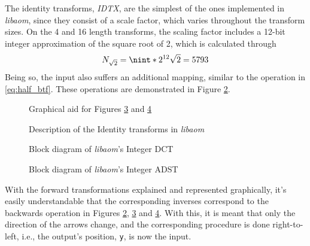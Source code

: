The identity transforms, \emph{IDTX}, are the simplest of the ones implemented in \emph{libaom}, since they consist of a scale factor, which varies throughout the transform sizes. On the 4 and 16 length transforms, the scaling factor includes a 12-bit integer approximation of the square root of 2, which is calculated through
\begin{equation}
    N_{\sqrt{2}}=\nint*{2^{12}\sqrt{2}}=5793
\end{equation}
Being so, the input also suffers an additional mapping, similar to the operation in \ref{eq:half_btf}. These operations are demonstrated in Figure \ref{fig:intIDEN}.

\begin{figure}[!htbp]
    \centering
    
    \caption{Graphical aid for Figures \ref{fig:intDCT} and \ref{fig:intADST}}
    \label{fig:aid}
\end{figure}

\begin{figure}[!htbp]
    \centering
    
    \caption{Description of the Identity transforms in \emph{libaom}}
    \label{fig:intIDEN}
\end{figure}

\begin{figure}[!htbp]
    \centering
    
    \caption{Block diagram of \emph{libaom}'s Integer DCT}
    \label{fig:intDCT}
\end{figure}

\clearpage
\begin{landscape}
    \vspace*{\fill}
    \begin{figure}[!htpb]
        \centering
        
        \caption{Block diagram of \emph{libaom}'s Integer ADST}
        \label{fig:intADST}
    \end{figure}
    \vspace*{\fill}        
\end{landscape}

With the forward transformations explained and represented graphically, it's easily understandable that the corresponding inverses correspond to the backwards operation in Figures \ref{fig:intIDEN}, \ref{fig:intDCT} and \ref{fig:intADST}. With this, it is meant that only the direction of the arrows change, and the corresponding procedure is done right-to-left, i.e., the output's position, \texttt{y}, is now the input.

